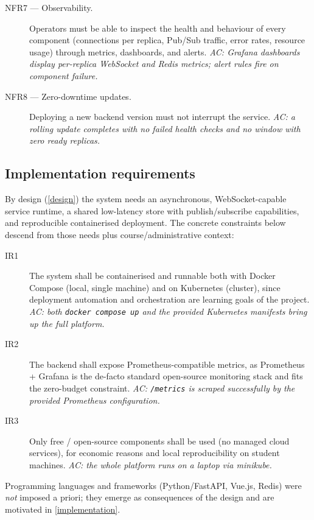 \documentclass{scrartcl}
\begin{document}
\begin{description}
  \item[NFR7 --- Observability.] Operators must be able to inspect the
  health and behaviour of every component (connections per replica,
  Pub/Sub traffic, error rates, resource usage) through metrics,
  dashboards, and alerts. \emph{AC: Grafana dashboards display per-replica
  WebSocket and Redis metrics; alert rules fire on component failure.}

  \item[NFR8 --- Zero-downtime updates.] Deploying a new backend version
  must not interrupt the service. \emph{AC: a rolling update completes
  with no failed health checks and no window with zero ready replicas.}
\end{description}

\subsection{Implementation requirements}

By design (\cref{design}) the system needs an asynchronous, WebSocket-capable
service runtime, a shared low-latency store with publish/subscribe
capabilities, and reproducible containerised deployment. The concrete
constraints below descend from those needs plus course/administrative
context:

\begin{description}
  \item[IR1] The system shall be containerised and runnable both with
  Docker Compose (local, single machine) and on Kubernetes (cluster),
  since deployment automation and orchestration are learning goals of the
  project. \emph{AC: both \texttt{docker compose up} and the provided
  Kubernetes manifests bring up the full platform.}

  \item[IR2] The backend shall expose Prometheus-compatible metrics, as
  Prometheus + Grafana is the de-facto standard open-source monitoring
  stack and fits the zero-budget constraint. \emph{AC: \texttt{/metrics}
  is scraped successfully by the provided Prometheus configuration.}

  \item[IR3] Only free / open-source components shall be used (no managed
  cloud services), for economic reasons and local reproducibility on
  student machines. \emph{AC: the whole platform runs on a laptop via
  minikube.}
\end{description}

Programming languages and frameworks (Python/FastAPI, Vue.js, Redis) were
\emph{not} imposed a priori; they emerge as consequences of the design and
are motivated in \cref{implementation}.
\end{document}
